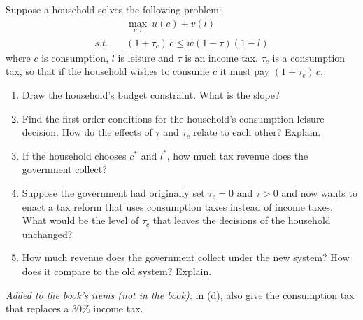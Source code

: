 

\noindent Suppose a household solves the following problem:
\begin{align*}
&\max_{c,l}\ u(c)+v(l)\\
s.t.\quad &(1+\tau_c)\,c\le w(1-\tau)(1-l)
\end{align*}
where $c$ is consumption, $l$ is leisure and $\tau$ is an income tax. $\tau_c$ is a consumption tax, so that if the household wishes to
consume $c$ it must pay $(1+\tau_c)\,c$.
\begin{enumerate}[label=(\alph*),leftmargin=2.2em,topsep=2pt,itemsep=1pt]
\item Draw the household's budget constraint. What is the slope?
\item Find the first-order conditions for the household's consumption-leisure decision. How do the effects of $\tau$ and $\tau_c$
relate to each other? Explain.
\item If the household chooses $c^*$ and $l^*$, how much tax revenue does the government collect?
\item Suppose the government had originally set $\tau_c=0$ and $\tau>0$ and now wants to enact a tax reform that uses consumption
taxes instead of income taxes. What would be the level of $\tau_c$ that leaves the decisions of the household unchanged?
\item How much revenue does the government collect under the new system? How does it compare to the old system? Explain.
\end{enumerate}
\noindent\textit{Added to the book's items (not in the book):} in (d), also give the consumption tax that replaces a 30\% income tax.
\resolespaco

